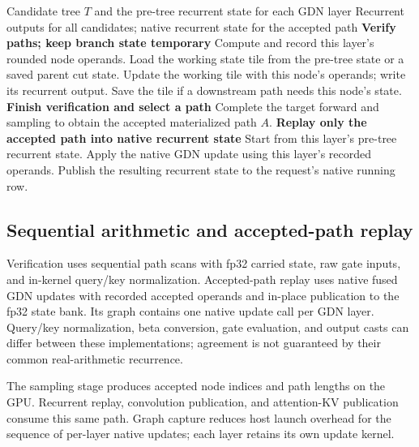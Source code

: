 \documentclass[conference]{IEEEtran}
\begin{document}
\begin{algorithm*}[t]
\caption{Path-parallel scan and accepted-path replay}
\label{alg:scan-replay}
\normalsize\linespread{1.08}\selectfont\raggedright
\begin{algorithmic}[1]
\Require Candidate tree $T$ and the pre-tree recurrent state for each GDN layer
\Ensure Recurrent outputs for all candidates; native recurrent state for the accepted path
\Statex \textbf{Verify paths; keep branch state temporary}
  \State Compute and record this layer's rounded node operands.
      \State Load the working state tile from the pre-tree state or a saved parent cut state.
        \State Update the working tile with this node's operands; write its recurrent output.
        \State Save the tile if a downstream path needs this node's state.
      \EndFor
    \EndParallelFor
  \EndFor
\EndFor
\Statex \textbf{Finish verification and select a path}
\State Complete the target forward and sampling to obtain the accepted materialized path $A$.
\Statex \textbf{Replay only the accepted path into native recurrent state}
  \State Start from this layer's pre-tree recurrent state.
    \State Apply the native GDN update using this layer's recorded operands.
  \EndFor
  \State Publish the resulting recurrent state to the request's native running row.
\EndFor
\end{algorithmic}
\end{algorithm*}

\subsection{Sequential arithmetic and accepted-path replay}
\label{sec:reconstruction-numerics}
Verification uses sequential path scans with fp32 carried state, raw gate inputs, and in-kernel query/key normalization. Accepted-path replay uses native fused GDN updates with recorded accepted operands and in-place publication to the fp32 state bank. Its graph contains one native update call per GDN layer. Query/key normalization, beta conversion, gate evaluation, and output casts can differ between these implementations; agreement is not guaranteed by their common real-arithmetic recurrence.

The sampling stage produces accepted node indices and path lengths on the GPU. Recurrent replay, convolution publication, and attention-KV publication consume this same path. Graph capture reduces host launch overhead for the sequence of per-layer native updates; each layer retains its own update kernel.
\end{document}
